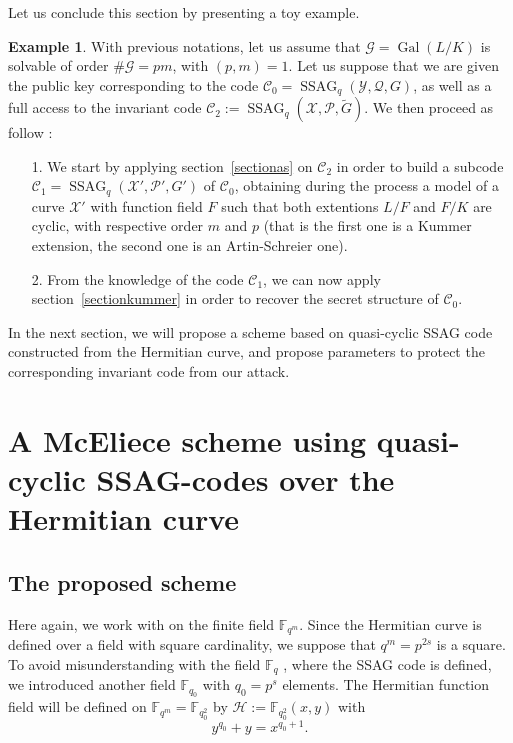 \documentclass[10pt]{article}
\theoremstyle{definition}
\theoremstyle{definition}
\newtheorem{expl}[thm]{Example}
\theoremstyle{definition}
\newcommand{\s}{\vspace{0.3cm}}
\newcommand{\C}{\mathcal{C}}
\newcommand{\fqm}{\mathbb{F}_{q^m}}
\newcommand{\fq}{\mathbb{F}_q}
\newcommand{\X}{\mathcal{X}}
\newcommand{\Y}{\mathcal{Y}}
\newcommand{\PR}{\mathcal{P}}
\newcommand{\QR}{\mathcal{Q}}
\newcommand{\G}{\mathcal{G}}
\newcommand{\Gal}{\operatorname{Gal}}
\newcommand{\ssag}{\operatorname{SSAG}}
\begin{document}
Let us conclude this section by presenting a toy example.

\begin{expl} With previous notations, let us assume that $\G=\Gal(L/K)$ is solvable of order $\#\G = pm$, with $(p,m)=1$. Let us suppose that we are given the public key corresponding to the code $\C_0 = \ssag_q(\Y,\QR,G)$, as well as a full access to the invariant code $\C_2 := \ssag_q(\X,\PR,\tilde{G})$. We then proceed as follow : 
\begin{enumerate}
\item[1.] We start by applying section~\ref{sectionas} on $\C_2$ in order to build a subcode $\C_1 = \ssag_q(\X',\PR',G')$ of $\C_0$, obtaining during the process a model of a curve $\X'$ with function field $F$ such that both extentions $L/F$ and $F/K$ are cyclic, with respective order $m$ and $p$ (that is the first one is a Kummer extension, the second one is an Artin-Schreier one).
\item[2.] From the knowledge of the code $\C_1$, we can now apply section~\ref{sectionkummer} in order to recover the secret structure of $\C_0$.
\end{enumerate}
\end{expl}

\s

In the next section, we will propose a scheme based on quasi-cyclic SSAG code constructed from the Hermitian curve, and propose parameters to protect the corresponding invariant code from our attack.

\s

\section{A McEliece scheme using quasi-cyclic SSAG-codes over the Hermitian curve}

\s

\subsection{The proposed scheme}

\s

\color{purple}
Here again, we work with on the finite field $\fqm$. Since the Hermitian curve is defined over a field with square cardinality, we suppose that $q^m = p^{2s}$ is a square. To avoid misunderstanding with the field $\fq$ , where the SSAG code is
defined, we introduced another field $\mathbb{F}_{q_0}$ with $q_0 = p^s$ elements.   
The Hermitian function field will be defined on $\fqm = \mathbb{F}_{q_0^2}$ by $\mathcal{H} := \mathbb{F}_{q_0^2}(x,y)$ with
\[y^{q_0}+y=x^{q_0+1}.\]
\color{black}
\end{document}
